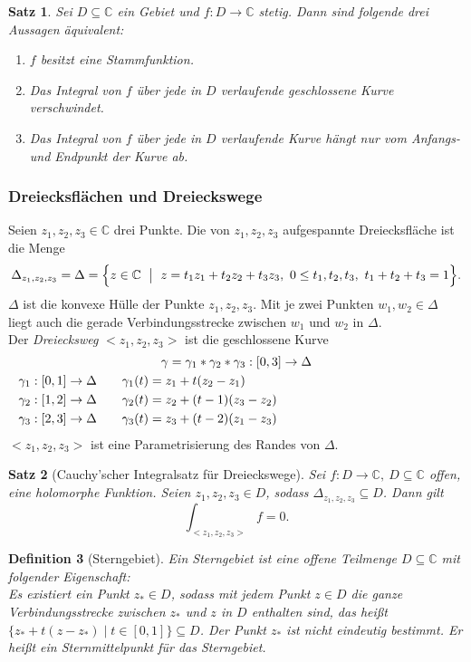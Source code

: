 \documentclass[a4paper,12pt]{article}
\theoremstyle{newthm}
\newtheorem{thm}{Satz}[subsection]
\theoremstyle{newdef}
\newtheorem{defn}[thm]{Definition}
\theoremstyle{newrem}
\newcommand{\C}{\mathbb{C}}
\begin{document}
		\begin{thm}\label{2.2.4}
			Sei $ D \subseteq \C $ ein Gebiet und $ f: D \to \C $ stetig. Dann sind folgende drei Aussagen äquivalent:
			\begin{enumerate}[label={\roman*})]
				\item $f$ besitzt eine Stammfunktion.
				\item Das Integral von $f$ über jede in $D$ verlaufende geschlossene Kurve verschwindet.
				\item Das Integral von $f$ über jede in $D$ verlaufende Kurve hängt nur vom Anfangs- und Endpunkt der Kurve ab.
			\end{enumerate}
		\end{thm}
		
		\subsubsection*{Dreiecksflächen und Dreieckswege}
		Seien $ z_1,z_2,z_3 \in \C $ drei Punkte. Die von $ z_1,z_2,z_3 $ aufgespannte Dreiecksfläche ist die Menge
		\[ \Delta_{z_1,z_2,z_3} = \Delta = \Bigl\{ z \in \C \ \bigm|\ z = t_1z_1 + t_2z_2 + t_3z_3,\ 0 \leq t_1,t_2,t_3,\ t_1+t_2+t_3 = 1 \Bigr\}. \]
		$\Delta$ ist die konvexe Hülle der Punkte $ z_1,z_2,z_3 $. Mit je zwei Punkten $ w_1,w_2 \in \Delta $ liegt auch die gerade Verbindungsstrecke zwischen $w_1$ und $w_2$ in $\Delta$.\\
		Der \emph{Dreiecksweg} $ <z_1,z_2,z_3> $ ist die geschlossene Kurve
		\begin{align*}
			\noalign{\centering $\gamma = \gamma_1 * \gamma_2 * \gamma_3: [0,3] \to \Delta$}
			\gamma_1 &: [0,1] \to \Delta \qquad \gamma_1 (t) = z_1 + t(z_2-z_1)\\
			\gamma_2 &: [1,2] \to \Delta \qquad \gamma_2 (t) = z_2 + (t-1)(z_3-z_2)\\
			\gamma_3 &: [2,3] \to \Delta \qquad \gamma_3 (t) = z_3 + (t-2)(z_1 - z_3)
		\end{align*}
		$ <z_1,z_2,z_3> $ ist eine Parametrisierung des Randes von $\Delta$.
			
		\begin{thm}[Cauchy'scher Integralsatz für Dreieckswege]
			Sei $ f: D \to \C,\ D \subseteq \C $ offen, eine holomorphe Funktion. Seien $z_1,z_2,z_3 \in D$, sodass $ \Delta_{z_1,z_2,z_3} \subseteq D $. Dann gilt
			\[ \int_{<z_1,z_2,z_3>} f = 0. \]
		\end{thm}
		
		\begin{defn}[Sterngebiet]
			Ein \emph{Sterngebiet} ist eine offene Teilmenge $ D \subseteq \C $ mit folgender Eigenschaft:\\
			Es existiert ein Punkt $ z_* \in D $, sodass mit jedem Punkt $ z \in D $ die ganze Verbindungsstrecke zwischen $z_*$ und $z$ in $D$ enthalten sind, das heißt $ \{ z_* + t(z-z_*) \mid t \in [0,1] \} \subseteq D $. Der Punkt $z_*$ ist nicht eindeutig bestimmt. Er heißt ein \emph{Sternmittelpunkt} für das Sterngebiet.
		\end{defn}
		
\end{document}
